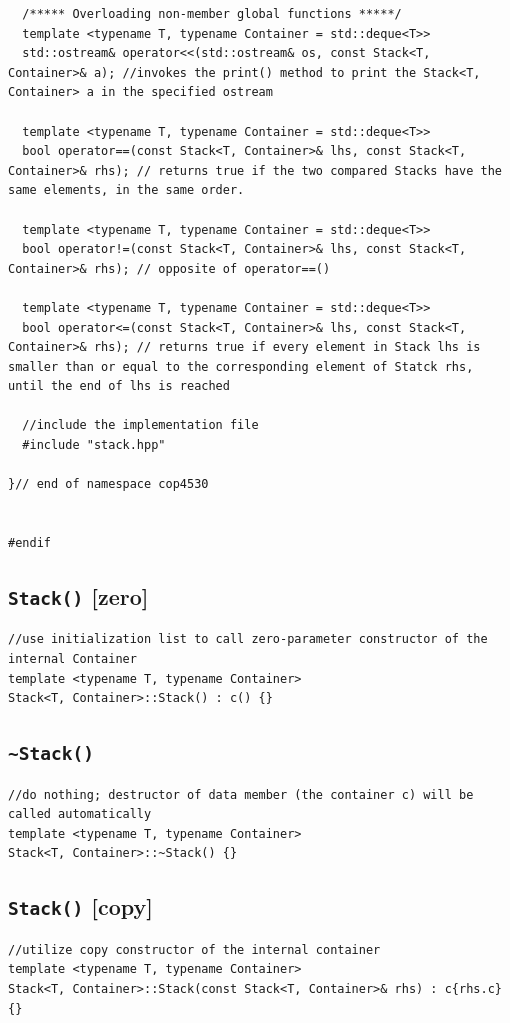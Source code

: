 \documentclass[12pt]{book}
\begin{document}
\begin{verbatim}
  /***** Overloading non-member global functions *****/
  template <typename T, typename Container = std::deque<T>>
  std::ostream& operator<<(std::ostream& os, const Stack<T, Container>& a); //invokes the print() method to print the Stack<T, Container> a in the specified ostream    

  template <typename T, typename Container = std::deque<T>>
  bool operator==(const Stack<T, Container>& lhs, const Stack<T, Container>& rhs); // returns true if the two compared Stacks have the same elements, in the same order. 

  template <typename T, typename Container = std::deque<T>>
  bool operator!=(const Stack<T, Container>& lhs, const Stack<T, Container>& rhs); // opposite of operator==()

  template <typename T, typename Container = std::deque<T>>
  bool operator<=(const Stack<T, Container>& lhs, const Stack<T, Container>& rhs); // returns true if every element in Stack lhs is smaller than or equal to the corresponding element of Statck rhs, until the end of lhs is reached

  //include the implementation file 
  #include "stack.hpp"

}// end of namespace cop4530


#endif
\end{verbatim}
\subsection{\texttt{Stack()} [zero]}
\label{sec:org3c93043}
\begin{verbatim}
//use initialization list to call zero-parameter constructor of the internal Container 
template <typename T, typename Container>
Stack<T, Container>::Stack() : c() {}
\end{verbatim}
\subsection{\texttt{\textasciitilde{}Stack()}}
\label{sec:orga3609a8}
\begin{verbatim}
//do nothing; destructor of data member (the container c) will be called automatically
template <typename T, typename Container>
Stack<T, Container>::~Stack() {}
\end{verbatim}
\subsection{\texttt{Stack()} [copy]}
\label{sec:orgeb36640}
\begin{verbatim}
//utilize copy constructor of the internal container
template <typename T, typename Container>
Stack<T, Container>::Stack(const Stack<T, Container>& rhs) : c{rhs.c} {}
\end{verbatim}
\end{document}
